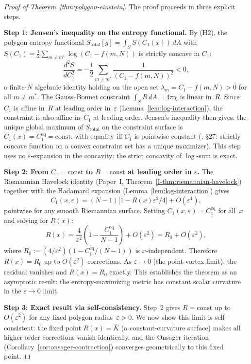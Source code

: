 \begin{proof}[Proof of Theorem~\ref{thm:polygon-einstein}]
The proof proceeds in three explicit steps.

\textbf{Step 1: Jensen's inequality on the entropy functional.}
By (H2), the polygon entropy functional
$S_{\mathrm{total}}[g] = \int_S S(C_1(x))\,dA$
with
$S(C_1) = \tfrac{1}{2}\sum_{m \ne m^*}\log(C_1 - f(m,N))$
is strictly concave in $C_1$:
\[
  \frac{d^2 S}{dC_1^2}
  = -\frac{1}{2}\sum_{m \ne m^*} \frac{1}{(C_1 - f(m,N))^2}
  < 0,
\]
a finite-$N$ algebraic identity holding on the open set
$\lambda_m = C_1 - f(m,N) > 0$ for all $m \ne m^*$.
The Gauss--Bonnet constraint $\int_S R\,dA = 4\pi\chi$
is linear in~$R$.
Since $C_1$ is affine in~$R$ at leading order in~$\varepsilon$
(Lemma~\ref{lem:log-interaction}), the constraint is also
affine in~$C_1$ at leading order.
Jensen's inequality then gives: the unique global maximum
of $S_{\mathrm{total}}$ on the constraint surface is
$C_1(x) = C_1^{\mathrm{eq}} = \mathrm{const}$,
with equality iff $C_1$ is pointwise constant
(\citealt{Rockafellar1970}, \S27:
strictly concave function on a convex constraint set
has a unique maximizer).
This step uses no $\varepsilon$-expansion in the concavity:
the strict concavity of $\log$-sum is exact.

\textbf{Step 2: From $C_1 = \mathrm{const}$ to
$R = \mathrm{const}$ at leading order in $\varepsilon$.}
The Riemannian Havelock identity
(Paper~I, Theorem~\ref*{I-thm:riemannian-havelock})
together with the Hadamard expansion
(Lemma~\ref{lem:log-interaction}) gives
\begin{equation}\label{eq:C1-expansion-leading}
  C_1(x,\varepsilon)
  = (N{-}1)\bigl[1 - R(x)\varepsilon^2/4\bigr]
  + O(\varepsilon^4),
\end{equation}
pointwise for any smooth Riemannian surface.
Setting $C_1(x,\varepsilon) = C_1^{\mathrm{eq}}$ for all~$x$
and solving for $R(x)$:
\[
  R(x) = \frac{4}{\varepsilon^2}
  \left(1 - \frac{C_1^{\mathrm{eq}}}{N{-}1}\right)
  + O(\varepsilon^2)
  = R_0 + O(\varepsilon^2),
\]
where $R_0 := (4/\varepsilon^2)(1 - C_1^{\mathrm{eq}}/(N{-}1))$
is $x$-independent.
Therefore $R(x) = R_0$ up to $O(\varepsilon^2)$ corrections.
As $\varepsilon \to 0$ (the point-vortex limit), the
residual vanishes and $R(x) = R_0$ exactly.
This establishes the theorem as an asymptotic result:
the entropy-maximizing metric has constant scalar curvature
in the $\varepsilon \to 0$ limit.

\textbf{Step 3: Exact result via self-consistency.}
Step~2 gives $R = \mathrm{const}$ up to $O(\varepsilon^2)$
for any fixed polygon radius~$\varepsilon > 0$.
We now show this limit is self-consistent: the fixed point
$R(x) = \bar K$ (a constant-curvature surface) makes all
higher-order corrections vanish identically, and the Onsager
iteration (Corollary~\ref{cor:onsager-contraction}) converges
geometrically to this fixed point.


\end{proof}
